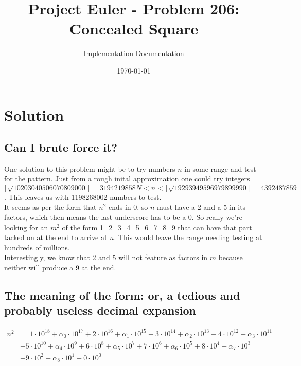 \documentclass{article}
\title{Project Euler - Problem 206: Concealed Square}
\author{Implementation Documentation}
\date{\today}
\begin{document}
\maketitle

\section{Solution}

\subsection{Can I brute force it?}

One solution to this problem might be to try numbers $n$ in some range and test for the pattern.  Just from a rough inital
approximation one could try integers 
$\lfloor\sqrt{10203040506070809000}\rfloor = 3194219858N < n < \lfloor\sqrt{19293949596979899990}\rfloor = 4392487859$.  
This leaves us with 1198268002 numbers to test.\\

It seems as per the form that $n^2$ ends in 0, so $n$ must have a 2 and a 5 in its factors, which then means the last
 underscore has to be a 0.  So really we're looking for an $m^2$ of the form 1\_2\_3\_4\_5\_6\_7\_8\_9 that can have
 that part tacked on at the end to arrive at $n$.  This would leave the range needing testing at hundreds of millions. \\

Interestingly, we know that 2 and 5 will not feature as factors in $m$ because neither will produce a 9 at the end. \\

\subsection{The meaning of the form: or, a tedious and probably useless decimal expansion}

\begin{align*}
    n^2 &= 1 \cdot 10^{18} + \alpha_0 \cdot 10^{17} + 2 \cdot 10^{16} + \alpha_1 \cdot 10^{15} 
        + 3 \cdot 10^{14} + \alpha_2 \cdot 10^{13} + 4 \cdot 10^{12} + \alpha_3 \cdot 10^{11} \\
        &+ 5 \cdot 10^{10} + \alpha_4 \cdot 10^{9} + 6 \cdot 10^{8} + \alpha_5 \cdot 10^{7} 
        + 7 \cdot 10^{6} + \alpha_6 \cdot 10^{5} + 8 \cdot 10^{4} + \alpha_7 \cdot 10^{3} \\
        &+ 9 \cdot 10^{2} + \alpha_8 \cdot 10^{1} + 0 \cdot 10^{0} 
\end{align*}
\end{document}
